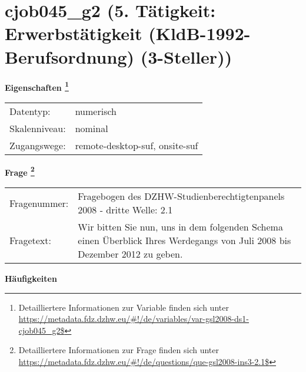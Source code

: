 
    \setcounter{footnote}{0}

    \vspace*{-1.8cm}
	\section{cjob045\_g2 (5. Tätigkeit: Erwerbstätigkeit (KldB-1992-Berufsordnung) (3-Steller))}
	\label{section:cjob045_g2}



    \vspace*{0.5cm}
    \noindent\textbf{Eigenschaften
	\footnote{Detailliertere Informationen zur Variable finden sich unter
		\url{https://metadata.fdz.dzhw.eu/\#!/de/variables/var-gsl2008-ds1-cjob045_g2$}}}\\
	\begin{tabularx}{\hsize}{@{}lX}
	Datentyp: & numerisch \\
	Skalenniveau: & nominal \\
	Zugangswege: &
	  remote-desktop-suf, 
	  onsite-suf
 \\
    \end{tabularx}



				\vspace*{0.5cm}
                \noindent\textbf{Frage
	                \footnote{Detailliertere Informationen zur Frage finden sich unter
		              \url{https://metadata.fdz.dzhw.eu/\#!/de/questions/que-gsl2008-ins3-2.1$}}}\\
				\begin{tabularx}{\hsize}{@{}lX}
					Fragenummer: &
					  Fragebogen des DZHW-Studienberechtigtenpanels 2008 - dritte Welle:
					  2.1
 \\
					Fragetext: & Wir bitten Sie nun, uns in dem folgenden Schema einen Überblick Ihres Werdegangs von Juli 2008 bis Dezember 2012 zu geben. \\
				\end{tabularx}





        		\vspace*{0.5cm}
                \noindent\textbf{Häufigkeiten}

